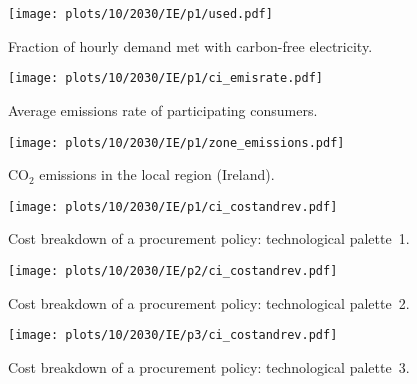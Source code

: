 \begin{figure*}
    \centering
    \begin{subfigure}{0.5\textwidth}
        \centering
        \caption{Fraction of hourly demand met with carbon-free electricity.}
        \texttt{[image: plots/10/2030/IE/p1/used.pdf]}
        \label{fig:10-2030-IE-p1-used}
    \end{subfigure}%
    \begin{subfigure}{0.5\textwidth}
        \centering
        \caption{Average emissions rate of participating consumers.}
        \texttt{[image: plots/10/2030/IE/p1/ci\_emisrate.pdf]}
        \label{fig:10-2030-IE-p1-ci_emisrate}
    \end{subfigure}

    \begin{subfigure}{0.5\textwidth}
        \centering
        \caption{CO$_2$ emissions in the local region (Ireland).}
        \texttt{[image: plots/10/2030/IE/p1/zone\_emissions.pdf]}
        \label{fig:10-2030-IE-p1-zone_emissions}
    \end{subfigure}%
    \begin{subfigure}{0.5\textwidth}
        \caption{Cost breakdown of a procurement policy: technological palette~1.}
        \texttt{[image: plots/10/2030/IE/p1/ci\_costandrev.pdf]}
        \label{fig:10-2030-IE-p1-ci_costandrev}
    \end{subfigure}%

    \begin{subfigure}{0.5\textwidth}
        \centering
        \caption{Cost breakdown of a procurement policy: technological palette~2.}
        \texttt{[image: plots/10/2030/IE/p2/ci\_costandrev.pdf]}
        \label{fig:10-2030-IE-p2-ci_costandrev}
    \end{subfigure}%
    \begin{subfigure}{0.5\textwidth}
        \centering
        \caption{Cost breakdown of a procurement policy: technological palette~3.}
        \texttt{[image: plots/10/2030/IE/p3/ci\_costandrev.pdf]}
        \label{fig:10-2030-IE-p3-ci_costandrev}
    \end{subfigure}

    \caption{Results for the scenario of Ireland 2030; 10\% participation rate. 
    Figures \ref{fig:10-2030-IE-p1-used}--\ref{fig:10-2030-IE-p1-ci_costandrev} display the technological palette~1 scenario.}
    \label{fig:10-2030-IE-6plots}
\end{figure*}



